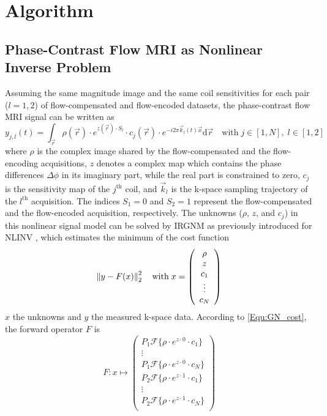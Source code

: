 \section{Algorithm}
\subsection{Phase-Contrast Flow MRI as Nonlinear Inverse Problem}
Assuming the same magnitude image and the same coil sensitivities for each pair ($l=1,2$) of flow-compensated and flow-encoded datasets, the phase-contrast flow MRI signal can be written as
\begin{equation} \label{Equ:signal}
 y_{j,l}(t) = \int_{\vec{r}} \rho(\vec{r}) \cdot e^{z(\vec{r}) \cdot S_l} \cdot c_{j}(\vec{r}) \cdot e^{-i 2\pi \vec{k}_{l}(t) \vec{x}} \text{d}\vec{r} \quad \text{with} \; j \in [1,N], \; l \in [1,2]
\end{equation}
where $\rho$ is the complex image shared by the flow-compensated and the flow-encoding acquisitions, $z$ denotes a complex map which contains the phase differences $\Delta\phi$ in its imaginary part, while the real part is constrained to zero, $c_j$ is the sensitivity map of the $j^{\text{th}}$ coil, and $\vec{k}_{l}$ is the k-space sampling trajectory of the $l^{\text{th}}$ acquisition. The indices $S_1=0$ and $S_2=1$ represent the flow-compensated and the flow-encoded acquisition, respectively. The unknowns ($\rho$, $z$, and $c_j$) in this nonlinear signal model can be solved by IRGNM \cite{1996_regu_inv,2004_iter_inv} as previously introduced for NLINV \cite{2008_NLINV,2010_NLINV_Heart,2010_20ms_Uecker}, which estimates the minimum of the cost function
\begin{equation} \label{Equ:GN_cost}
  \left\lVert y-F(x)\right\rVert_2^2 \quad \text{with} \; x = \left( \begin{array}{c} 
  \rho \\
  z \\
  c_1 \\
  \vdots \\
  c_N
  \end{array} \right)
\end{equation}
$x$ the unknowns and $y$ the measured k-space data. According to \cref{Equ:GN_cost}, the forward operator $F$ is
\begin{equation} \label{Equ:GN_fwd}
  F: x \mapsto \left( \begin{array}{c}
  P_1 \mathcal{F} \{\rho \cdot e^{z \cdot 0} \cdot c_1 \} \\
  \vdots \\
  P_1 \mathcal{F} \{\rho \cdot e^{z \cdot 0} \cdot c_N \} \\
  P_2 \mathcal{F} \{\rho \cdot e^{z \cdot 1} \cdot c_1 \} \\
  \vdots \\
  P_2 \mathcal{F} \{\rho \cdot e^{z \cdot 1} \cdot c_N \} \\
  \end{array}  \right)
\end{equation}
